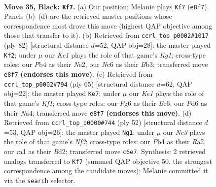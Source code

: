 \documentclass[11pt]{article}
\begin{document}
\clearpage

\begin{figure}[p]\centering
\begin{subfigure}{0.46\textwidth}\centering
\resizebox{\linewidth}{!}{%
\newchessgame
\chessboard[
  setfen={r3k1r1/6bp/p1np2p1/4p1P1/1p2P2P/1P3PBB/P1PK4/R6R b - - 0 35},
  showmover=false,
  pgfstyle=straightmove, color=movearrow, markmove={e8-f7}
]}
\caption{}
\end{subfigure}\hfill
\begin{subfigure}{0.46\textwidth}\centering
\resizebox{\linewidth}{!}{%
\newchessgame
\chessboard[
  setfen={2b2k2/2p1r2p/1n1p4/1P1Pppp1/1P6/1B1P1P1P/4N1P1/4R1K1 w - - 1 42},
  showmover=false,
  pgfstyle=straightmove, color=movearrow, markmove={g1-f2}
]}
\caption{}
\end{subfigure}
\\[4pt]
\begin{subfigure}{0.46\textwidth}\centering
\resizebox{\linewidth}{!}{%
\newchessgame
\chessboard[
  setfen={r4kr1/1p6/2b3p1/2p1Pp1p/n1P2P1P/pN2P1P1/P2R4/KB1R4 b - - 0 33},
  showmover=false,
  pgfstyle=straightmove, color=movearrow, markmove={f8-e7}
]}
\caption{}
\end{subfigure}\hfill
\begin{subfigure}{0.46\textwidth}\centering
\resizebox{\linewidth}{!}{%
\newchessgame
\chessboard[
  setfen={r1r3k1/1p3pp1/p3nb2/P2p3p/1P5P/3P1NP1/R2B1P2/1R3K2 w - - 0 27},
  showmover=false,
  pgfstyle=straightmove, color=movearrow, markmove={f3-g1}
]}
\caption{}
\end{subfigure}
\caption{\textbf{Move 35, Black: \texttt{Kf7}.} (a) Our position; Melanie plays \texttt{Kf7} (\texttt{e8f7}). Panels (b)--(d) are the retrieved master positions whose correspondence most drove this move (highest QAP objective among those that transfer to it). (b) Retrieved from \texttt{ccrl\_top\_p0002\#1017} (ply 82) [structural distance $d$=52, QAP obj=28]: the master played \texttt{Kf2}; under $\mu$ our \emph{Ke1} plays the role of that game's \emph{Kg1}; cross-type roles: our \emph{P}b4 as their \emph{N}e2, our \emph{N}c6 as their \emph{B}b3; transferred move \texttt{e8f7} \textbf{(endorses this move)}. (c) Retrieved from \texttt{ccrl\_top\_p0002\#794} (ply 65) [structural distance $d$=62, QAP obj=22]: the master played \texttt{Ke7}; under $\mu$ our \emph{Ke1} plays the role of that game's \emph{Kf1}; cross-type roles: our \emph{P}g6 as their \emph{B}c6, our \emph{P}d6 as their \emph{N}a4; transferred move \texttt{e8f7} \textbf{(endorses this move)}. (d) Retrieved from \texttt{ccrl\_top\_p0000\#744} (ply 52) [structural distance $d$=53, QAP obj=26]: the master played \texttt{Ng1}; under $\mu$ our \emph{Nc3} plays the role of that game's \emph{Nf3}; cross-type roles: our \emph{P}b4 as their \emph{R}a2, our \emph{r}a1 as their \emph{B}d2; transferred move \texttt{c6e7}. Synthesis: 2 retrieved analogs transferred to \texttt{Kf7} (summed QAP objective 50, the strongest correspondence among the candidate moves); Melanie committed it via the \texttt{search} selector.}
\label{fig:thought-m69}
\end{figure}
\end{document}
